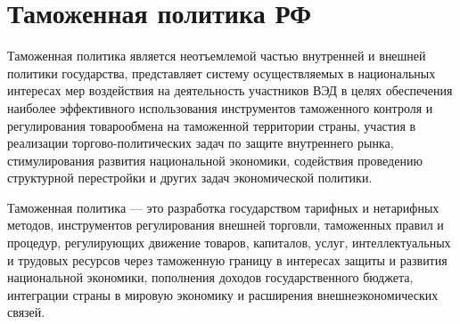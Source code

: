 \section{Таможенная политика РФ}

Таможенная политика является неотъемлемой частью внутренней и внешней политики государства, представляет систему осуществляемых в национальных интересах мер воздействия на деятельность участников ВЭД в целях обеспечения наиболее эффективного использования инструментов таможенного контроля и регулирования товарообмена на таможенной территории страны, участия в реализации торгово-политических задач по защите внутреннего рынка, стимулирования развития национальной экономики, содействия проведению структурной перестройки и других задач экономической политики.

Таможенная политика --- это разработка государством тарифных и нетарифных методов, инструментов регулирования внешней торговли, таможенных правил и процедур, регулирующих движение товаров, капиталов, услуг, интеллектуальных и трудовых ресурсов через таможенную границу в интересах защиты и развития национальной экономики, пополнения доходов государственного бюджета, интеграции страны в мировую экономику и расширения внешнеэкономических связей.